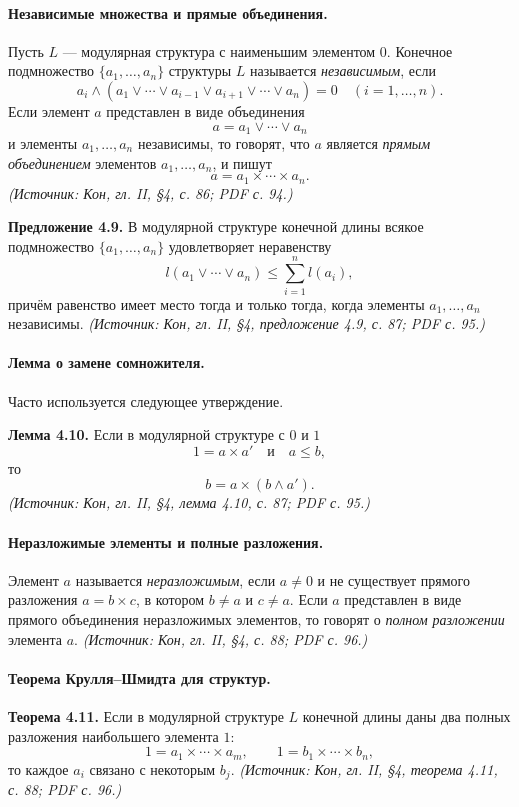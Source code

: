 \documentclass[a4paper,12pt]{article}
\begin{document}
\paragraph{Независимые множества и прямые объединения.}
Пусть \(L\) — модулярная структура с наименьшим элементом \(0\). Конечное подмножество \(\{a_1,\ldots,a_n\}\) структуры \(L\) называется \emph{независимым}, если
\[
a_i\wedge(a_1\vee\cdots\vee a_{i-1}\vee a_{i+1}\vee\cdots\vee a_n)=0
\quad(i=1,\ldots,n).
\]
Если элемент \(a\) представлен в виде объединения
\[
a=a_1\vee\cdots\vee a_n
\]
и элементы \(a_1,\ldots,a_n\) независимы, то говорят, что \(a\) является \emph{прямым объединением} элементов \(a_1,\ldots,a_n\), и пишут
\[
a=a_1\times\cdots\times a_n.
\]
\textit{(Источник: Кон, гл. II, §4, с. 86; PDF с. 94.)}

\textbf{Предложение 4.9.} В модулярной структуре конечной длины всякое подмножество \(\{a_1,\ldots,a_n\}\) удовлетворяет неравенству
\[
l(a_1\vee\cdots\vee a_n)\le \sum_{i=1}^{n}l(a_i),
\]
причём равенство имеет место тогда и только тогда, когда элементы \(a_1,\ldots,a_n\) независимы.
\textit{(Источник: Кон, гл. II, §4, предложение 4.9, с. 87; PDF с. 95.)}

\paragraph{Лемма о замене сомножителя.}
Часто используется следующее утверждение.

\textbf{Лемма 4.10.} Если в модулярной структуре с \(0\) и \(1\)
\[
1=a\times a'\quad\text{и}\quad a\le b,
\]
то
\[
b=a\times(b\wedge a').
\]
\textit{(Источник: Кон, гл. II, §4, лемма 4.10, с. 87; PDF с. 95.)}

\paragraph{Неразложимые элементы и полные разложения.}
Элемент \(a\) называется \emph{неразложимым}, если \(a\ne0\) и не существует прямого разложения \(a=b\times c\), в котором \(b\ne a\) и \(c\ne a\). Если \(a\) представлен в виде прямого объединения неразложимых элементов, то говорят о \emph{полном разложении} элемента \(a\).
\textit{(Источник: Кон, гл. II, §4, с. 88; PDF с. 96.)}

\paragraph{Теорема Крулля--Шмидта для структур.}
\textbf{Теорема 4.11.} Если в модулярной структуре \(L\) конечной длины даны два полных разложения наибольшего элемента \(1\):
\[
1=a_1\times\cdots\times a_m,
\qquad
1=b_1\times\cdots\times b_n,
\]
то каждое \(a_i\) связано с некоторым \(b_j\).
\textit{(Источник: Кон, гл. II, §4, теорема 4.11, с. 88; PDF с. 96.)}
\end{document}
